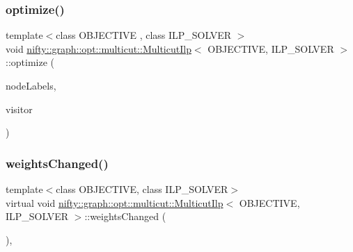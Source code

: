 \subsubsection{\texorpdfstring{optimize()}{optimize()}}
{\footnotesize\ttfamily template$<$class O\+B\+J\+E\+C\+T\+I\+VE , class I\+L\+P\+\_\+\+S\+O\+L\+V\+ER $>$ \\
void \hyperlink{classnifty_1_1graph_1_1opt_1_1multicut_1_1MulticutIlp}{nifty\+::graph\+::opt\+::multicut\+::\+Multicut\+Ilp}$<$ O\+B\+J\+E\+C\+T\+I\+VE, I\+L\+P\+\_\+\+S\+O\+L\+V\+ER $>$\+::optimize (\begin{DoxyParamCaption}\item[{\hyperlink{classnifty_1_1graph_1_1opt_1_1multicut_1_1MulticutIlp_a0e1396c7332495a1d4af41e5df69398b}{Node\+Labels\+Type} \&}]{node\+Labels,  }\item[{\hyperlink{classnifty_1_1graph_1_1opt_1_1multicut_1_1MulticutIlp_a0fccd157c0176cba9c08f877b3798437}{Visitor\+Base\+Type} $\ast$}]{visitor }\end{DoxyParamCaption})\hspace{0.3cm}{\ttfamily [virtual]}}

\mbox{\label{classnifty_1_1graph_1_1opt_1_1multicut_1_1MulticutIlp_a532d846fdb2feecb240373e87fec82a4}} 
\subsubsection{\texorpdfstring{weights\+Changed()}{weightsChanged()}}
{\footnotesize\ttfamily template$<$class O\+B\+J\+E\+C\+T\+I\+VE, class I\+L\+P\+\_\+\+S\+O\+L\+V\+ER$>$ \\
virtual void \hyperlink{classnifty_1_1graph_1_1opt_1_1multicut_1_1MulticutIlp}{nifty\+::graph\+::opt\+::multicut\+::\+Multicut\+Ilp}$<$ O\+B\+J\+E\+C\+T\+I\+VE, I\+L\+P\+\_\+\+S\+O\+L\+V\+ER $>$\+::weights\+Changed (\begin{DoxyParamCaption}{ }\end{DoxyParamCaption})\hspace{0.3cm}{\ttfamily [inline]}, {\ttfamily [virtual]}}



